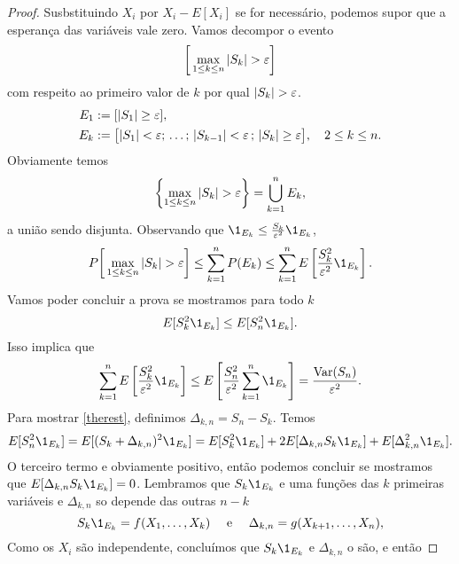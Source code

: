 \begin{topics}
\begin{proof}
  Susbstituindo $X_i$ por $X_i-E[X_i]$ se for necessário, podemos supor que a esperança das variáveis vale zero.
  Vamos decompor o evento
  \begin{equation}
    \bigg[ \max_{1\le k\le n} |S_k|>\gep \bigg]
  \end{equation}
  com respeito ao primeiro valor de $k$ por qual $|S_k|>\gep$.
 \begin{equation}
   \begin{split}
     E_1 & := [|S_1|\ge \varepsilon ],\\
     E_k & := \big[|S_1|<\varepsilon;\, \dots ;\,  |S_{k-1}|<\varepsilon\, ;  \, |S_k|\ge \varepsilon \big],
           \quad 2\le k\le n.
   \end{split}
 \end{equation}
 Obviamente temos $$\left\{\max_{1\le k\le n} |S_k|>\gep\right\}=\bigcup_{k=1}^n E_k,$$
 a união sendo disjunta.
 Observando que $\1_{E_k} \leq \tfrac{S_k}{\gep^2} \1_{E_k}$,
 \begin{equation}
   P \bigg[ \max_{1\le k\le n} |S_k|>\gep \bigg] \le  \sum_{k=1}^n P(E_k)\le  \sum_{k=1}^n E\left[  \frac{S^2_k}{\gep^2}\1_{E_k}\right].
 \end{equation}
 Vamos poder concluir a prova se mostramos para todo $k$
 \begin{equation}\label{therest}
   E[S^2_k\1_{E_k}]\le E[S^2_n\1_{E_k}].
 \end{equation}
 Isso implica que
 \begin{equation}
   \sum_{k=1}^n E\left[  \frac{S^2_k}{\gep^2}\1_{E_k}\right]\le E\left [  \frac{S^2_n}{\gep^2}  \sum_{k=1}^n \1_{E_k}\right]= \frac{\Var(S_n)}{\gep^2}.
 \end{equation}
 Para mostrar \eqref{therest}, definimos $\Delta_{k,n}= S_n-S_k$.
 Temos
 \begin{equation}
   E[S^2_n\1_{E_k}]= E[(S_k+\Delta_{k,n})^2\1_{E_k}]= E[S_k^2\1_{E_k}]+2 E[ \Delta_{k,n} S_k \1_{E_k}]+  E[ \Delta^2_{k,n}\1_{E_k}].
 \end{equation}
 O terceiro termo e obviamente positivo, então podemos concluir se mostramos  que $E[ \Delta_{k,n} S_k \1_{E_k}]=0$.
 Lembramos que $S_k\1_{E_k}$ e uma funções das $k$ primeiras variáveis e $\Delta_{k,n}$ so depende das outras $n-k$
 \begin{equation}
   S_k \1_{E_k}=f(X_1,\dots,X_k) \quad \text{ e } \quad \Delta_{k,n}=g(X_{k+1},\dots,X_{n}),
 \end{equation}
 Como os $X_i$ são independente, concluímos que  $S_k \1_{E_k}$ e $\Delta_{k,n}$ o são, e então


\end{proof}
\end{topics}
